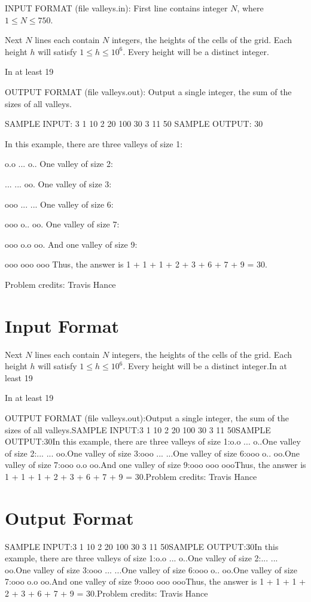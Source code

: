 \documentclass[12pt]{article}
\begin{document}
INPUT FORMAT (file valleys.in):
First line contains integer $N$, where $1 \le N \le 750$.

Next $N$ lines each contain $N$ integers, the heights of the cells of the grid.
Each height $h$ will satisfy $1 \le h \le 10^6$. Every height will be a distinct
integer.

In at least 19%

OUTPUT FORMAT (file valleys.out):
Output a single integer, the sum of the sizes of all valleys.

SAMPLE INPUT:
3
1 10 2
20 100 30
3 11 50
SAMPLE OUTPUT: 
30

In this example, there are three valleys of size 1:

o.o
...
o..
One valley of size 2:

...
...
oo.
One valley of size 3:

ooo
...
...
One valley of size 6:

ooo
o..
oo.
One valley of size 7:

ooo
o.o
oo.
And one valley of size 9:

ooo
ooo
ooo
Thus, the answer is 1 + 1 + 1 + 2 + 3 + 6 + 7 + 9 = 30.


Problem credits: Travis Hance



\section*{Input Format}
Next $N$ lines each contain $N$ integers, the heights of the cells of the grid.
Each height $h$ will satisfy $1 \le h \le 10^6$. Every height will be a distinct
integer.In at least 19%

In at least 19%

OUTPUT FORMAT (file valleys.out):Output a single integer, the sum of the sizes of all valleys.SAMPLE INPUT:3
1 10 2
20 100 30
3 11 50SAMPLE OUTPUT:30In this example, there are three valleys of size 1:o.o
...
o..One valley of size 2:...
...
oo.One valley of size 3:ooo
...
...One valley of size 6:ooo
o..
oo.One valley of size 7:ooo
o.o
oo.And one valley of size 9:ooo
ooo
oooThus, the answer is 1 + 1 + 1 + 2 + 3 + 6 + 7 + 9 = 30.Problem credits: Travis Hance

\section*{Output Format}
SAMPLE INPUT:3
1 10 2
20 100 30
3 11 50SAMPLE OUTPUT:30In this example, there are three valleys of size 1:o.o
...
o..One valley of size 2:...
...
oo.One valley of size 3:ooo
...
...One valley of size 6:ooo
o..
oo.One valley of size 7:ooo
o.o
oo.And one valley of size 9:ooo
ooo
oooThus, the answer is 1 + 1 + 1 + 2 + 3 + 6 + 7 + 9 = 30.Problem credits: Travis Hance
\end{document}
